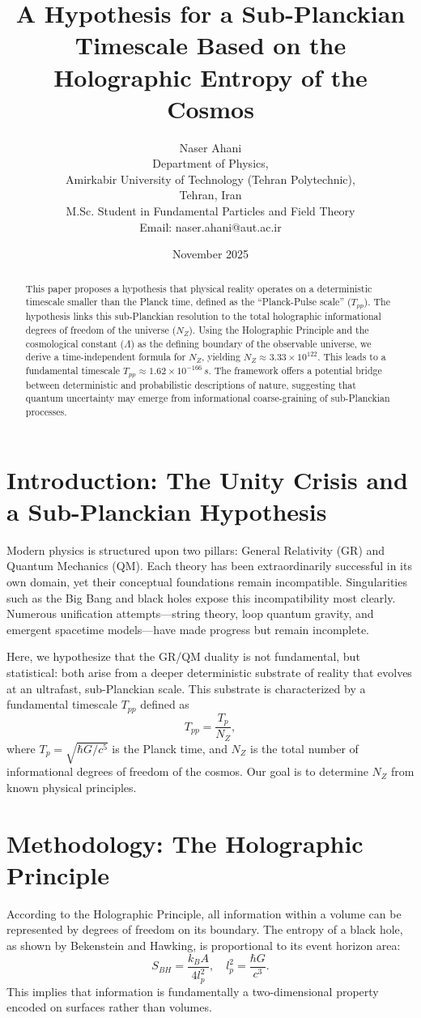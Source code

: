 \documentclass[12pt]{article}
\title{A Hypothesis for a Sub-Planckian Timescale Based on the Holographic Entropy of the Cosmos}
\author{Naser Ahani \\ Department of Physics, \\ Amirkabir University of Technology (Tehran Polytechnic), \\ Tehran, Iran \\ M.Sc. Student in Fundamental Particles and Field Theory \\ Email: naser.ahani@aut.ac.ir}
\date{November 2025}
\begin{document}
\maketitle

\begin{abstract}
This paper proposes a hypothesis that physical reality operates on a deterministic timescale smaller than the Planck time, defined as the ``Planck-Pulse scale'' ($T_{pp}$). The hypothesis links this sub-Planckian resolution to the total holographic informational degrees of freedom of the universe ($N_Z$). Using the Holographic Principle and the cosmological constant ($\Lambda$) as the defining boundary of the observable universe, we derive a time-independent formula for $N_Z$, yielding $N_Z \approx 3.33 \times 10^{122}$. This leads to a fundamental timescale $T_{pp} \approx 1.62 \times 10^{-166}\,s$. The framework offers a potential bridge between deterministic and probabilistic descriptions of nature, suggesting that quantum uncertainty may emerge from informational coarse-graining of sub-Planckian processes.
\end{abstract}

\section{Introduction: The Unity Crisis and a Sub-Planckian Hypothesis}
Modern physics is structured upon two pillars: General Relativity (GR) and Quantum Mechanics (QM). Each theory has been extraordinarily successful in its own domain, yet their conceptual foundations remain incompatible. Singularities such as the Big Bang and black holes expose this incompatibility most clearly. Numerous unification attempts---string theory, loop quantum gravity, and emergent spacetime models---have made progress but remain incomplete.

Here, we hypothesize that the GR/QM duality is not fundamental, but statistical: both arise from a deeper deterministic substrate of reality that evolves at an ultrafast, sub-Planckian scale. This substrate is characterized by a fundamental timescale $T_{pp}$ defined as
\begin{equation}
T_{pp} = \frac{T_p}{N_Z},
\end{equation}
where $T_p = \sqrt{\hbar G / c^5}$ is the Planck time, and $N_Z$ is the total number of informational degrees of freedom of the cosmos. Our goal is to determine $N_Z$ from known physical principles.

\section{Methodology: The Holographic Principle}
According to the Holographic Principle, all information within a volume can be represented by degrees of freedom on its boundary. The entropy of a black hole, as shown by Bekenstein and Hawking, is proportional to its event horizon area:
\begin{equation}
S_{BH} = \frac{k_B A}{4 l_p^2}, \quad l_p^2 = \frac{\hbar G}{c^3}.
\end{equation}
This implies that information is fundamentally a two-dimensional property encoded on surfaces rather than volumes.
\end{document}
